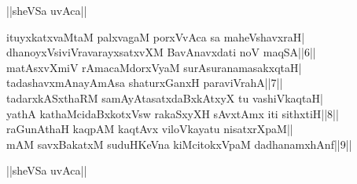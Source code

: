 \documentclass{article}
\begin{document}
\begin{center}
||sheVSa uvAca||
\end{center}

ituyxkatxvaMtaM palxvagaM porxVvAca sa maheVshavxraH|\\
dhanoyxVsiviVravarayxsatxvXM BavAnavxdati noV maqSA||6||\\
matAsxvXmiV rAmacaMdorxVyaM surAsuranamasakxqtaH|\\
tadashavxmAnayAmAsa shaturxGanxH paraviVrahA||7||\\
tadarxkASxthaRM samAyAtasatxdaBxkAtxyX tu vashiVkaqtaH|\\
yathA kathaMcidaBxkotxVsw rakaSxyXH sAvxtAmx iti sithxtiH||8||\\
raGunAthaH kaqpAM kaqtAvx viloVkayatu nisatxrXpaM||\\
mAM savxBakatxM suduHKeVna kiMcitokxVpaM dadhanamxhAnf||9||\\

\begin{center}
||sheVSa uvAca||
\end{center}
\end{document}
